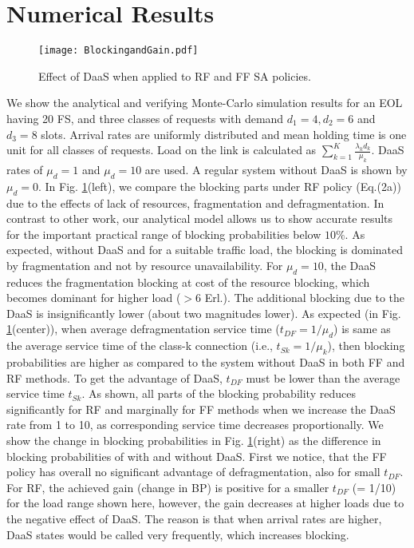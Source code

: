 \documentclass[letterpaper,10pt]{article}
\begin{document}
\section{Numerical Results}
\begin{figure}[t]
 \centering
\texttt{[image: BlockingandGain.pdf]}
\vspace{-8mm}
  \caption{Effect of DaaS when applied to RF and FF SA policies.}
\label{fig:defrag}
\vspace{-2mm}
\end{figure}
We show the analytical and verifying Monte-Carlo simulation results for an EOL having 20 FS, and three classes of requests with demand $d_1=4, d_2=6$ and $d_3=8$ slots. Arrival rates are uniformly distributed and mean holding time is one unit for all classes of requests. Load on the link is calculated as $\sum_{k =1 }^ K\frac{\lambda_k d_k}{\mu_k}$. DaaS rates of $\mu_d=1$ and $\mu_d=10$ are used. A regular system without DaaS is shown by $\mu_d=0$. In Fig. \ref{fig:defrag}(left), we compare the blocking parts under RF policy (Eq.(2a)) due to the effects of lack of resources, fragmentation and defragmentation. In contrast to other work, our analytical model allows us to show accurate results for the important practical range of blocking probabilities below $10\%$. As expected, without DaaS and for a suitable traffic load, the blocking is dominated by fragmentation and not by resource unavailability. For $\mu_d=10$, the DaaS  reduces the fragmentation blocking at cost of the resource blocking, which becomes dominant for higher load ($>6$ Erl.). The additional blocking due to the DaaS is insignificantly lower (about two magnitudes lower). As expected (in Fig. \ref{fig:defrag}(center)), when average defragmentation service time ($t_{DF}=1/\mu_d$) is same as the average service time of the class-k connection (i.e., $t_{Sk}=1/\mu_k$), then blocking probabilities are higher as compared to the system without DaaS in both FF and RF methods. To get the advantage of DaaS, $t_{DF}$ must be lower than the average service time $t_{Sk}$. As shown, all parts of the blocking probability reduces significantly for RF and marginally for FF methods when we increase the DaaS rate from 1 to 10, as corresponding service time decreases proportionally. We show the change in blocking probabilities in Fig. \ref{fig:defrag}(right) as the difference in blocking probabilities of with and without DaaS. First we notice, that the FF policy has overall no significant advantage of defragmentation, also for small $t_{DF}$. For RF, the achieved gain (change in BP) is positive for a smaller $t_{DF}$ (= 1/10) for the load range shown here, however, the gain decreases at higher loads due to the negative effect of DaaS. The reason is that when arrival rates are higher, DaaS states would be called very frequently, which increases blocking. 
\vspace{-2mm}
\end{document}
